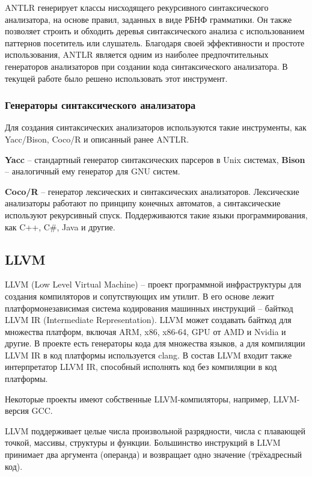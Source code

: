 ANTLR генерирует классы нисходящего рекурсивного синтаксического анализатора, на основе правил, заданных в виде РБНФ грамматики. Он также позволяет строить и обходить деревья синтаксического анализа с использованием паттернов посетитель или слушатель. Благодаря своей эффективности и
простоте использования, ANTLR является одним из наиболее предпочтительных генераторов анализаторов при создании кода синтаксического анализатора. В текущей работе было решено использовать этот инструмент. \\

\subsubsection{Генераторы синтаксического анализатора}
Для создания синтаксических анализаторов используются такие инструменты, как Yacc/Bison, Coco/R и описанный ранее ANTLR.

\textbf{Yacc} -- стандартный генератор синтаксических парсеров в Unix системах, \textbf{Bison} -- аналогичный ему генератор для GNU систем. \cite{bib:bison}

\textbf{Coco/R} -- генератор лексических и синтаксических анализаторов. Лексические анализаторы работают по принципу конечных автоматов, а синтаксические используют рекурсивный спуск. Поддерживаются такие языки программирования, как C++, C\#, Java и другие. \\

\subsection{LLVM}
LLVM (Low Level Virtual Machine) -- проект программной инфраструктуры для создания компиляторов и сопутствующих им утилит. В его основе лежит платформонезависимая система кодирования машинных инструкций -- байткод LLVM IR (Intermediate Representation). LLVM может создавать байткод для множества платформ, включая ARM, x86, x86-64, GPU от AMD и Nvidia и другие. В проекте есть генераторы кода для множества языков, а для компиляции LLVM IR в код платформы используется clang. В состав LLVM  входит также интерпретатор LLVM IR, способный исполнять код без компиляции в код платформы. \cite{bib:llvm}

Некоторые проекты имеют собственные LLVM-компиляторы, например, LLVM-версия GCC.

LLVM поддерживает целые числа произвольной разрядности, числа с плавающей точкой, массивы, структуры и функции. Большинство инструкций в LLVM принимает два аргумента (операнда) и возвращает одно значение (трёхадресный код).

